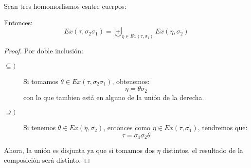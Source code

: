 \begin{lema}
    Sean tres homomorfismos esntre cuerpos:
    \begin{figure}[H]
        \centering
    \end{figure}
    Entonces:
    \begin{equation*}
        Ex(\tau,\sigma_2\sigma_1) = \biguplus_{\eta \in Ex(\tau,\sigma_1)} Ex(\eta,\sigma_2)
    \end{equation*}
    \begin{proof}
        Por doble inclusión:
        \begin{description}
            \item [$\subseteq )$] Si tomamos $\theta \in Ex(\tau,\sigma_2\sigma_1)$, obtenemos:
                \begin{equation*}
                    \eta = \theta\sigma_2
                \end{equation*}
                con lo que tambien está en alguno de la unión de la derecha.
            \item [$\supseteq )$]  Si tenemos $\theta \in Ex(\eta,\sigma_2)$, entonces como $\eta \in Ex(\tau,\sigma_1)$, tendremos que:
                \begin{equation*}
                    \tau = \sigma_1\sigma_2\theta
                \end{equation*}
        \end{description}
        \begin{figure}[H] %
            \centering
        \end{figure}
        Ahora, la unión es disjunta ya que si tomamos dos $\eta$ distintos, el resultado de la composición será distinto.
    \end{proof}
\end{lema}

